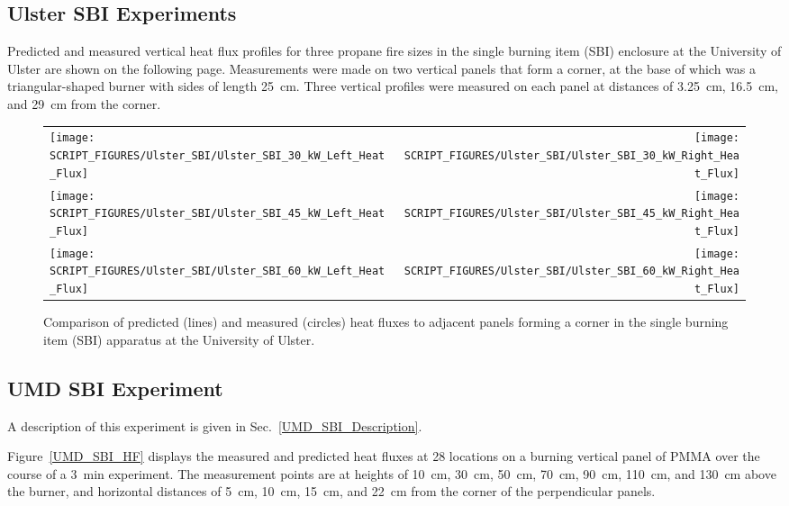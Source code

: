 \clearpage

\subsection{Ulster SBI Experiments}

Predicted and measured vertical heat flux profiles for three propane fire sizes in the single burning item (SBI) enclosure at the University of Ulster are shown on the following page. Measurements were made on two vertical panels that form a corner, at the base of which was a triangular-shaped burner with sides of length 25~cm. Three vertical profiles were measured on each panel at distances of 3.25~cm, 16.5~cm, and 29~cm from the corner.

\begin{figure}[h!]
\begin{tabular*}{\textwidth}{l@{\extracolsep{\fill}}r}
\texttt{[image: SCRIPT\_FIGURES/Ulster\_SBI/Ulster\_SBI\_30\_kW\_Left\_Heat\_Flux]} &
\texttt{[image: SCRIPT\_FIGURES/Ulster\_SBI/Ulster\_SBI\_30\_kW\_Right\_Heat\_Flux]} \\
\texttt{[image: SCRIPT\_FIGURES/Ulster\_SBI/Ulster\_SBI\_45\_kW\_Left\_Heat\_Flux]} &
\texttt{[image: SCRIPT\_FIGURES/Ulster\_SBI/Ulster\_SBI\_45\_kW\_Right\_Heat\_Flux]} \\
\texttt{[image: SCRIPT\_FIGURES/Ulster\_SBI/Ulster\_SBI\_60\_kW\_Left\_Heat\_Flux]} &
\texttt{[image: SCRIPT\_FIGURES/Ulster\_SBI/Ulster\_SBI\_60\_kW\_Right\_Heat\_Flux]}
\end{tabular*}
\label{Ulster_SBI}
\caption[Ulster SBI experiments, corner fire heat flux]
{Comparison of predicted (lines) and measured (circles) heat fluxes to adjacent panels forming a corner in the single
burning item (SBI) apparatus at the University of Ulster.}
\end{figure}

\clearpage

\subsection{UMD SBI Experiment}

A description of this experiment is given in Sec.~\ref{UMD_SBI_Description}.

Figure~\ref{UMD_SBI_HF} displays the measured and predicted heat fluxes at 28 locations on a burning vertical panel of PMMA over the course of a 3~min experiment. The measurement points are at heights of 10~cm, 30~cm, 50~cm, 70~cm, 90~cm, 110~cm, and 130~cm above the burner, and horizontal distances of 5~cm, 10~cm, 15~cm, and 22~cm from the corner of the perpendicular panels.

